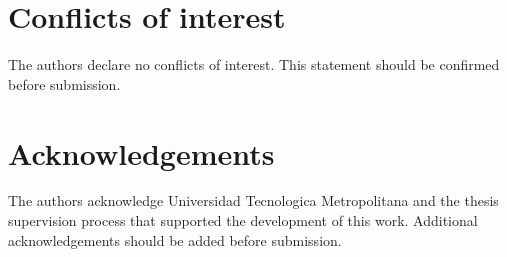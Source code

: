 \documentclass[11pt]{article}
\begin{document}
\section*{Conflicts of interest}
The authors declare no conflicts of interest. This statement should be confirmed before submission.

\section*{Acknowledgements}
The authors acknowledge Universidad Tecnologica Metropolitana and the thesis supervision process that supported the development of this work. Additional acknowledgements should be added before submission.



\end{document}

